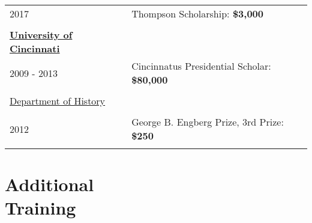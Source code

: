 \documentclass[margin,line,pifont,palatino,courier]{res}
\newenvironment{list1}{
  \begin{list}{\ding{113}}{%
      \setlength{\itemsep}{0in}
      \setlength{\parsep}{0in} \setlength{\parskip}{0in}
      \setlength{\topsep}{0in} \setlength{\partopsep}{0in}
      \setlength{\leftmargin}{0.17in}}}{\end{list}}
\begin{document}
\begin{resume}
\begin{tabular}{ll}
  2017       & Thompson Scholarship: \bf{\$3,000}\\
  \\
  \textbf{\underline{University of Cincinnati}}&\\
  2009 - 2013 & Cincinnatus Presidential Scholar: \bf{\$80,000}\\
  \\
  \underline{Department of History}&\\
  \\
  2012       & George B. Engberg Prize, 3rd Prize: \bf{\$250}  \\
  \\
\end{tabular}




\newpage
\section{\sc Additional\\ Training}


\end{resume}
\end{document}
